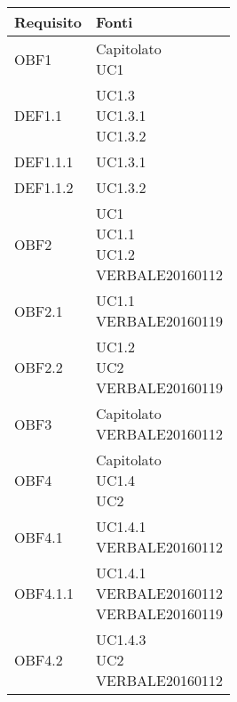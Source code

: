 \documentclass{scalatekids-article}
\begin{document}
\begin{longtable}[H]{|p{5.5cm}|p{5.5cm}|}
  \hline
  \textbf{Requisito} & \textbf{Fonti}\\
  \hline
  OBF1 & \multiLineCell[t]{Capitolato\\UC1\\}\\
  \hline
  DEF1.1 & \multiLineCell[t]{UC1.3\\UC1.3.1\\UC1.3.2\\}\\
  \hline
  DEF1.1.1 & \multiLineCell[t]{UC1.3.1\\}\\
  \hline
  DEF1.1.2 & \multiLineCell[t]{UC1.3.2\\}\\
  \hline
  OBF2 & \multiLineCell[t]{UC1\\UC1.1\\UC1.2\\VERBALE20160112\\}\\
  \hline
  OBF2.1 & \multiLineCell[t]{UC1.1\\VERBALE20160119\\}\\
  \hline
  OBF2.2 & \multiLineCell[t]{UC1.2\\UC2\\VERBALE20160119\\}\\
  \hline
  OBF3 & \multiLineCell[t]{Capitolato\\VERBALE20160112\\}\\
  \hline
  OBF4 & \multiLineCell[t]{Capitolato\\UC1.4\\UC2\\}\\
  \hline
  OBF4.1 & \multiLineCell[t]{UC1.4.1\\VERBALE20160112\\}\\
  \hline
  OBF4.1.1 & \multiLineCell[t]{UC1.4.1\\VERBALE20160112\\VERBALE20160119\\}\\
  \hline
  OBF4.2 & \multiLineCell[t]{UC1.4.3\\UC2\\VERBALE20160112\\}\\

\end{longtable}
\end{document}
